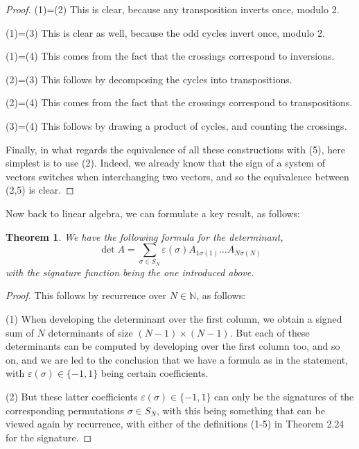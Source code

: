 \documentclass[12pt]{amsbook}
\newtheorem{theorem}{Theorem}[chapter]
\begin{document}
\begin{proof}
(1)=(2) This is clear, because any transposition inverts once, modulo 2.

\medskip

(1)=(3) This is clear as well, because the odd cycles invert once, modulo 2.

\medskip

(1)=(4) This comes from the fact that the crossings correspond to inversions.

\medskip

(2)=(3) This follows by decomposing the cycles into transpositions.

\medskip

(2)=(4) This comes from the fact that the crossings correspond to transpositions.

\medskip

(3)=(4) This follows by drawing a product of cycles, and counting the crossings.

\medskip

Finally, in what regards the equivalence of all these constructions with (5), here simplest is to use (2). Indeed, we already know that the sign of a system of vectors switches when interchanging two vectors, and so the equivalence between (2,5) is clear. 
\end{proof}

Now back to linear algebra, we can formulate a key result, as follows:


\begin{theorem}
We have the following formula for the determinant,
$$\det A=\sum_{\sigma\in S_N}\varepsilon(\sigma)A_{1\sigma(1)}\ldots A_{N\sigma(N)}$$
with the signature function being the one introduced above.
\end{theorem}

\begin{proof}
This follows by recurrence over $N\in\mathbb N$, as follows:

\medskip

(1) When developing the determinant over the first column, we obtain a signed sum of $N$ determinants of size $(N-1)\times(N-1)$. But each of these determinants can be computed by developing over the first column too, and so on, and we are led to the conclusion that we have a formula as in the statement, with $\varepsilon(\sigma)\in\{-1,1\}$ being certain coefficients.

\medskip

(2) But these latter coefficients $\varepsilon(\sigma)\in\{-1,1\}$ can only be the signatures of the corresponding permutations $\sigma\in S_N$, with this being something that can be viewed again by recurrence, with either of the definitions (1-5) in Theorem 2.24 for the signature.
\end{proof}
\end{document}
